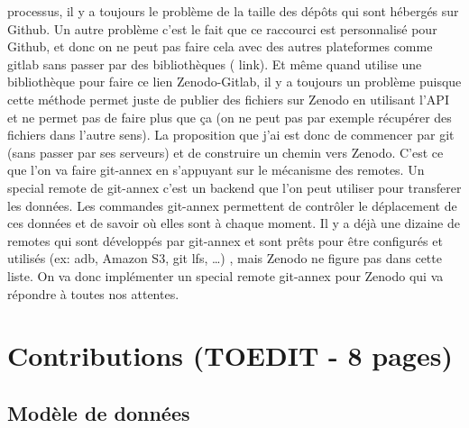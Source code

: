 \documentclass[11pt]{article}
\begin{document}
processus, il y a toujours le problème de la taille des dépôts qui
sont hébergés sur Github. Un autre problème c’est le fait que ce
raccourci est personnalisé pour Github, et donc on ne peut pas faire
cela avec des autres plateformes comme gitlab sans passer par des
bibliothèques ( link). Et même quand utilise une bibliothèque pour
faire ce lien Zenodo-Gitlab, il y a toujours un problème puisque cette
méthode permet juste de publier des fichiers sur Zenodo en utilisant
l'API et ne permet pas de faire plus que ça (on ne peut pas par
exemple récupérer des fichiers dans l’autre sens).
La proposition que j’ai est donc de commencer par git (sans passer par
ses serveurs) et de construire un chemin vers Zenodo. C’est ce que
l’on va faire git-annex en s’appuyant sur le mécanisme des remotes. Un
special remote de git-annex c’est un backend que l’on peut utiliser
pour transferer les données. Les commandes git-annex permettent de
contrôler le déplacement de ces données et de savoir où elles sont à
chaque moment. Il y a déjà une dizaine de remotes qui sont développés
par git-annex et sont prêts pour être configurés et utilisés (ex: adb,
Amazon S3, git lfs, …) , mais Zenodo ne figure pas dans cette
liste. On va donc implémenter un special remote git-annex pour Zenodo
qui va répondre à toutes nos attentes.

\section{Contributions (TOEDIT - 8 pages)}
\label{sec:org09a9f01}
\subsection{Modèle de données}
\label{sec:orgaa4d045}
\end{document}
